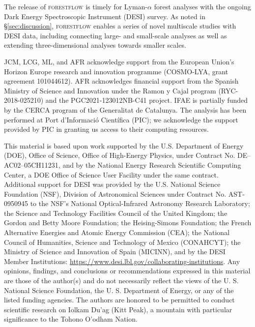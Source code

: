\documentclass{aa}
\newcommand{\lyaf}{Lyman-$\alpha$ forest\xspace}
\newcommand{\forestflow}{\textsc{forestflow}\xspace}
\begin{document}
The release of \forestflow is timely for \lyaf analyses with the ongoing Dark Energy Spectroscopic Instrument (DESI) survey. As noted in \S\ref{sec:discussion}, \forestflow enables a series of novel multiscale studies with DESI data, including connecting large- and small-scale analyses as well as extending three-dimensional analyses towards smaller scales.



\begin{acknowledgements}
JCM, LCG, ML, and AFR acknowledge support from the European Union’s Horizon Europe research and innovation programme (COSMO-LYA, grant agreement 101044612). AFR acknowledges financial support from the Spanish Ministry of Science and Innovation under the Ramon y Cajal program (RYC-2018-025210) and the PGC2021-123012NB-C41 project. IFAE is partially funded by the CERCA program of the Generalitat de Catalunya. The analysis has been performed at Port d’Informaci\'o Cient\'ifica (PIC); we acknowledge the support provided by PIC in granting us access to their computing resources.

This material is based upon work supported by the U.S. Department of Energy (DOE), Office of Science, Office of High-Energy Physics, under Contract No. DE–AC02–05CH11231, and by the National Energy Research Scientific Computing Center, a DOE Office of Science User Facility under the same contract. Additional support for DESI was provided by the U.S. National Science Foundation (NSF), Division of Astronomical Sciences under Contract No. AST-0950945 to the NSF’s National Optical-Infrared Astronomy Research Laboratory; the Science and Technology Facilities Council of the United Kingdom; the Gordon and Betty Moore Foundation; the Heising-Simons Foundation; the French Alternative Energies and Atomic Energy Commission (CEA); the National Council of Humanities, Science and Technology of Mexico (CONAHCYT); the Ministry of Science and Innovation of Spain (MICINN), and by the DESI Member Institutions: \url{https://www.desi.lbl.gov/collaborating-institutions}. Any opinions, findings, and conclusions or recommendations expressed in this material are those of the author(s) and do not necessarily reflect the views of the U. S. National Science Foundation, the U. S. Department of Energy, or any of the listed funding agencies. The authors are honored to be permitted to conduct scientific research on Iolkam Du’ag (Kitt Peak), a mountain with particular significance to the Tohono O’odham Nation.
\end{acknowledgements}
\end{document}
